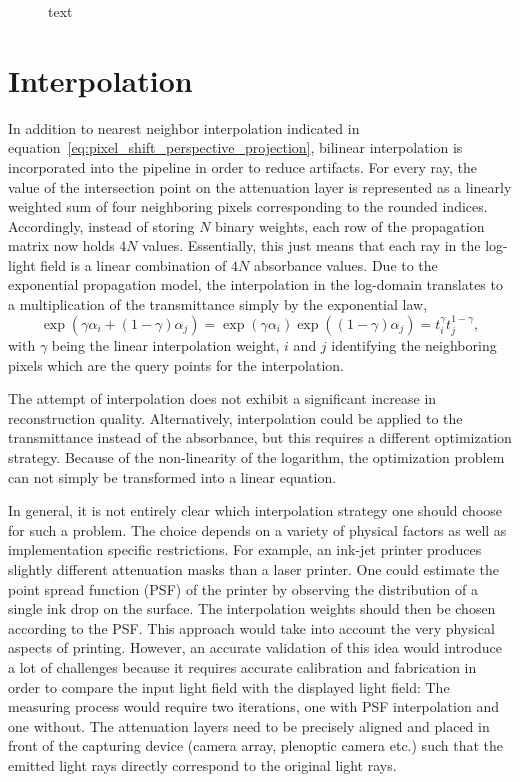 \begin{figure}[tb]
	
	\caption[]{text}
	\label{fig:ray_casting_from_camera}
\end{figure}

\section{Interpolation}
\label{sec:interpolation}

In addition to nearest neighbor interpolation indicated in equation~\ref{eq:pixel_shift_perspective_projection}, bilinear interpolation is incorporated into the pipeline in order to reduce artifacts.
For every ray, the value of the intersection point on the attenuation layer is represented as a linearly weighted sum of four neighboring pixels corresponding to the rounded indices.
Accordingly, instead of storing $N$ binary weights, each row of the propagation matrix now holds $4 N$ values.
Essentially, this just means that each ray in the log-light field is a linear combination of $4 N$ absorbance values.
Due to the exponential propagation model, the interpolation in the log-domain translates to a multiplication of the transmittance simply by the exponential law,
\begin{equation*}	
	\exp( \gamma \alpha_i + (1 - \gamma) \alpha_j ) = \exp( \gamma \alpha_i ) \exp( (1 - \gamma) \alpha_j ) = t_i^{\gamma} t_j^{1 - \gamma},
\end{equation*}
with $\gamma$ being the linear interpolation weight, $i$ and $j$ identifying the neighboring pixels which are the query points for the interpolation.

The attempt of interpolation does not exhibit a significant increase in reconstruction quality.
Alternatively, interpolation could be applied to the transmittance instead of the absorbance, but this requires a different optimization strategy.
Because of the non-linearity of the logarithm, the optimization problem can not simply be transformed into a linear equation.

In general, it is not entirely clear which interpolation strategy one should choose for such a problem.
The choice depends on a variety of physical factors as well as implementation specific restrictions.
For example, an ink-jet printer produces slightly different attenuation masks than a laser printer.
One could estimate the point spread function (PSF) of the printer by observing the distribution of a single ink drop on the surface.
The interpolation weights should then be chosen according to the PSF.
This approach would take into account the very physical aspects of printing.
However, an accurate validation of this idea would introduce a lot of challenges because it requires accurate calibration and fabrication in order to compare the input light field with the displayed light field:
The measuring process would require two iterations, one with PSF interpolation and one without.
The attenuation layers need to be precisely aligned and placed in front of the capturing device (camera array, plenoptic camera etc.) such that the emitted light rays directly correspond to the original light rays.

